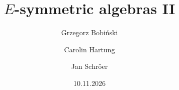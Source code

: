 \documentclass[12pt,reqno]{amsart}
\theoremstyle{definition}
\begin{document}


\date{10.11.2026}

\title{$E$-symmetric algebras II}


\author{Grzegorz Bobi\'nski}
\address{Grzegorz Bobi\'nski\newline
Faculty of Mathematics and Computer Science\newline
Nicolaus Copernicus University\newline
ul. Chopina 12/18-100 Toru\'n\newline
Poland}


\author{Carolin Hartung}
\address{Carolin Hartung\newline
Mathematisches Institut\newline
Universit\"at Bonn\newline
Endenicher Allee 60 Bonn\newline
Germany}


\author{Jan Schr\"oer}
\address{Jan Schr\"oer\newline
Mathematisches Institut\newline
Universit\"at Bonn\newline
Endenicher Allee 60 Bonn\newline
Germany}
\end{document}
